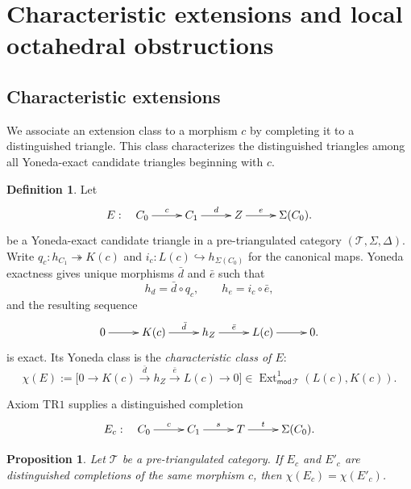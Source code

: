 \documentclass[a4paper,11pt,reqno]{amsart}
\newtheorem{proposition}[proposition]{Proposition}
\theoremstyle{definition}
\newtheorem{definition}[definition]{Definition}
\theoremstyle{plain}
\numberwithin{equation}{section}
\newcommand{\T}{\mathcal T}
\newcommand{\Ext}{\operatorname{Ext}}
\begin{document}
\section{Characteristic extensions and local octahedral obstructions}
\label{sec:obstruction}

\subsection{Characteristic extensions}

We associate an extension class to a morphism $c$ by completing it to a
distinguished triangle.  This class characterizes the distinguished
triangles among all Yoneda-exact candidate triangles beginning with $c$.

\begin{definition}
\label{def:characteristic-class-candidate}
Let
\begin{equation*}
\xymatrix@C=2.2pc{
 E:\quad C_0\ar[r]^-{c}&C_1\ar[r]^-{d}&Z\ar[r]^-{e}&\Sigma(C_0).
}
\end{equation*}
be a Yoneda-exact candidate triangle in a pre-triangulated category
$(\T,\Sigma,\Delta)$.  Write
$q_c:h_{C_1}\twoheadrightarrow K(c)$ and
$i_c:L(c)\hookrightarrow h_{\Sigma(C_0)}$ for the canonical maps.
Yoneda exactness gives unique morphisms $\bar d$ and $\bar e$ such
that
\[
 h_d=\bar d\circ q_c,
 \qquad
 h_e=i_c\circ\bar e,
\]
and the resulting sequence
\begin{equation*}
\xymatrix@C=2.2pc{
0\ar[r]&K(c)\ar[r]^-{\bar d}&h_Z\ar[r]^-{\bar e}&L(c)\ar[r]&0.
}
\end{equation*}
is exact.  Its Yoneda class is the \emph{characteristic class of $E$}:
\[
 \chi(E):=
 \bigl[0\to K(c)\xrightarrow{\bar d}h_Z
       \xrightarrow{\bar e}L(c)\to0\bigr]
 \in\Ext^1_{\mathsf{mod}\,\T}(L(c),K(c)).
\]
\end{definition}

Axiom $\mathrm{TR1}$ supplies a distinguished completion
\begin{equation*}
\xymatrix@C=2.2pc{
E_c:\quad C_0\ar[r]^-{c}&C_1\ar[r]^-{s}&T\ar[r]^-{t}&\Sigma(C_0).
}
\end{equation*}

\begin{proposition}
\label{prop:characteristic-class-independence}
Let $\T$ be a pre-triangulated category.  If $E_c$ and
$E'_c$ are distinguished completions of the same morphism $c$, then
$\chi(E_c)=\chi(E'_c)$.
\end{proposition}
\end{document}
